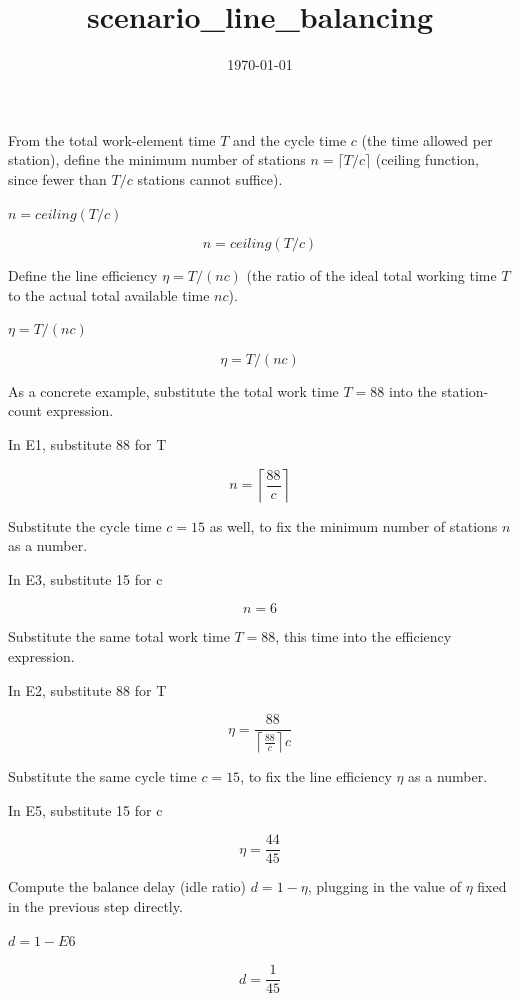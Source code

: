 \documentclass[dvipdfmx]{article}
\title{scenario\_line\_balancing}
\date{\today}
\begin{document}
\maketitle

From the total work-element time $T$ and the cycle time $c$ (the time allowed per station), define the minimum number of stations $n=\lceil T/c\rceil$ (ceiling function, since fewer than $T/c$ stations cannot suffice).

$n = ceiling(T / c)$

\begin{equation}
  n = ceiling(T / c)
  \label{eq:E1}
\end{equation}

Define the line efficiency $\eta=T/(nc)$ (the ratio of the ideal total working time $T$ to the actual total available time $nc$).

$\eta = T / (n c)$

\begin{equation}
  \eta = T / (n c)
  \label{eq:E2}
\end{equation}

As a concrete example, substitute the total work time $T=88$ into the station-count expression.

In E1, substitute 88 for T

\begin{equation}
  n = \left \lceil \frac{88}{c} \right \rceil
  \label{eq:E3}
\end{equation}

Substitute the cycle time $c=15$ as well, to fix the minimum number of stations $n$ as a number.

In E3, substitute 15 for c

\begin{equation}
  n = 6
  \label{eq:E4}
\end{equation}

Substitute the same total work time $T=88$, this time into the efficiency expression.

In E2, substitute 88 for T

\begin{equation}
  \eta = \frac{88}{\left \lceil \frac{88}{c} \right \rceil c}
  \label{eq:E5}
\end{equation}

Substitute the same cycle time $c=15$, to fix the line efficiency $\eta$ as a number.

In E5, substitute 15 for c

\begin{equation}
  \eta = \frac{44}{45}
  \label{eq:E6}
\end{equation}

Compute the balance delay (idle ratio) $d=1-\eta$, plugging in the value of $\eta$ fixed in the previous step directly.

$d = 1 - E6$

\begin{equation}
  d = \frac{1}{45}
  \label{eq:E7}
\end{equation}
\end{document}

